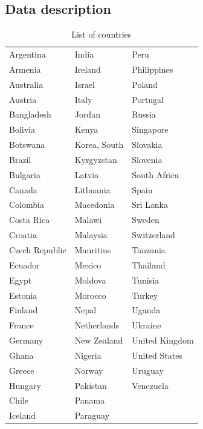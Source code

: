 \begin{refsection}
\begin{subappendices}
  \section{Data description}
  
    \begin{table}[ht!]
    \caption{List of countries}
    \label{ch3tab:countries}
    \centering
    \begin{tabular}{lll}
      \toprule
      Argentina 	& India 		& Peru \\ 
      Armenia 		& Ireland 		& Philippines \\ 
      Australia 	& Israel 		& Poland \\ 
      Austria 		& Italy 		& Portugal \\ 
      Bangladesh 	& Jordan 		& Russia \\ 
      Bolivia 		& Kenya 		& Singapore \\ 
      Botswana 		& Korea, South	& Slovakia \\ 
      Brazil 		& Kyrgyzstan 	& Slovenia \\ 
      Bulgaria 		& Latvia 		& South Africa \\ 
      Canada 		& Lithuania 	& Spain  \\ 
      Colombia 		& Macedonia 	& Sri Lanka\\ 
      Costa Rica 	& Malawi 		& Sweden   \\ 
      Croatia 		& Malaysia 		& Switzerland \\ 
      Czech Republic & Mauritius 	& Tanzania \\ 
      Ecuador 		& Mexico 		& Thailand \\ 
      Egypt 		& Moldova 		& Tunisia \\ 
      Estonia 		& Morocco 		& Turkey \\ 
      Finland 		& Nepal 		& Uganda \\ 
      France		& Netherlands 	& Ukraine \\ 
      Germany 		& New Zealand 	& United Kingdom \\ 
      Ghana 		& Nigeria 		& United States \\ 
      Greece 		& Norway 		& Uruguay \\ 
      Hungary 		& Pakistan		& Venezuela \\ 
      Chile 		& Panama 		& \\ 
      Iceland 		& Paraguay 		&  \\ 
      \bottomrule
    \end{tabular}
    \end{table}

\end{subappendices}
\end{refsection}
